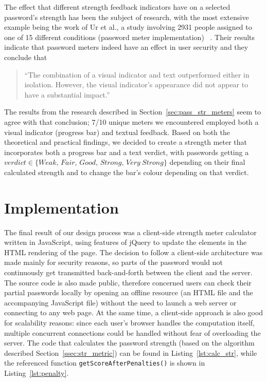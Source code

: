     The effect that different strength feedback indicators have on a selected password's strength has been the subject of research, with the most extensive example being the work of Ur et al., a study involving 2931 people assigned to one of 15 different conditions (password meter implementation) ~\cite{strength_meter_effect}. Their results indicate that password meters indeed have an effect in user security and they conclude that
    \begin{quote}
    ``The combination of a visual indicator and text outperformed either in isolation. However, the visual indicator’s appearance did not appear to have a substantial impact.''
    \end{quote}

    The results from the research described in Section~\ref{sec:pass_str_meters} seem to agree with that conclusion; 7/10 unique meters we encountered employed both a visual indicator (progress bar) and textual feedback. Based on both the theoretical and practical findings, we decided to create a
    strength meter that incorporates both a progress bar and a text verdict, with passwords getting a $verdict \in \{Weak,\, Fair,\, Good,\, Strong,\, Very\ Strong\}$ depending on their final calculated strength and to change the bar's colour depending on that verdict.


\section{Implementation}
  \label{sec:implementation}
  The final result of our design process was a client-side strength meter calculator written in JavaScript, using features of jQuery to update the elements in the HTML rendering of the page. The decision to follow a client-side architecture was made mainly for security reasons, so parts of the password would not continuously get transmitted back-and-forth between the client and the server. The source code is also made public, therefore concerned users can check their partial passwords locally by opening an offline resource (an HTML file and the accompanying JavaScript file) without the need to launch a web server or connecting to any web page. At the same time, a client-side approach is also good for scalability reasons: since each user's browser handles the computation itself, multiple concurrent connections could be handled without fear of overloading the server. The code that calculates the password strength (based on the algorithm described Section~\ref{ssec:str_metric}) can be found in Listing~\ref{lst:calc_str}, while the referenced function \texttt{getScoreAfterPenalties()} is shown in Listing~\ref{lst:penalty}.


